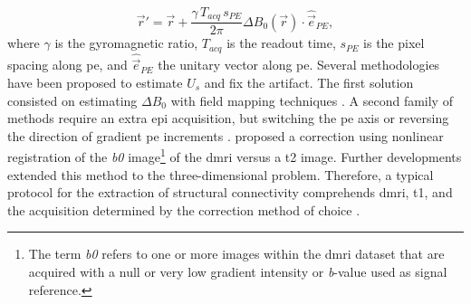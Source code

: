   \begin{equation}
  \vec{r}' = \vec{r} + \frac{\gamma \, T_{acq}\, s_{PE}}{2\pi}\Delta B_0(\vec{r}) \cdot \hat{\vec{e}}_{PE},
  \label{eq:fieldmap}
  \end{equation}
%
where $\gamma$ is the gyromagnetic ratio, $T_{acq}$ is the readout time,
  $s_{PE}$ is the pixel spacing along \gls*{pe}, and $\hat{\vec{e}}_{PE}$ the unitary
  vector along \gls*{pe}.
Several methodologies have been proposed to estimate $U_s$ and fix the artifact.
The first solution consisted on estimating $\Delta B_0$ with field mapping
  techniques \citep{andersson_modeling_2001}.
A second family of methods require an extra \gls*{epi} acquisition, but switching
  the \gls*{pe} axis \citep{chiou_simple_2000} or reversing the direction of gradient \gls*{pe}
  increments \citep{cordes_geometric_2000,holland_efficient_2010}.
\cite{kybic_unwarping_2000} proposed a correction using nonlinear registration of the \emph{b0}
  image\footnote{The term \emph{b0} refers to one or more images within the
  \gls*{dmri} dataset that are acquired with a null or very low gradient intensity or
   \emph{b}-value used as signal reference.} of the \gls*{dmri} versus a \gls*{t2} image.
Further developments \citep{irfanoglu_susceptibility_2011} extended this method to the
  three-dimensional problem.
Therefore, a typical protocol for the extraction of structural connectivity
  comprehends \gls*{dmri}, \gls*{t1}, and the acquisition determined by the correction
  method of choice \citep{daducci_connectome_2012}.


